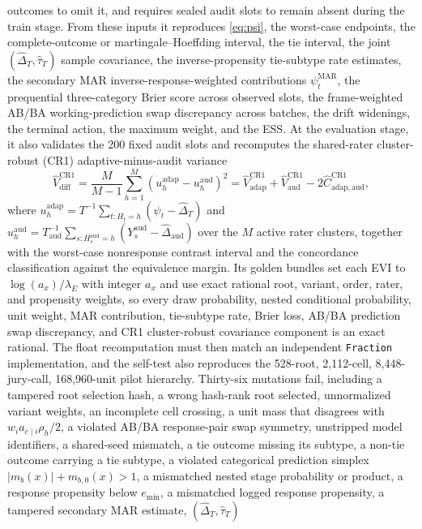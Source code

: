 \documentclass{article}
\begin{document}
outcomes to omit it, and requires sealed audit slots to remain absent during the
train stage. From these inputs it reproduces \cref{eq:psi}, the worst-case
endpoints, the complete-outcome or martingale--Hoeffding interval, the tie
interval, the joint $(\widehat\Delta_T,\widehat\tau_T)$ sample covariance, the
inverse-propensity tie-subtype rate estimates, the secondary MAR
inverse-response-weighted contributions $\psi_t^{\mathrm{MAR}}$, the prequential
three-category Brier score across observed slots, the frame-weighted AB/BA
working-prediction swap discrepancy across batches, the drift widenings, the terminal action, the maximum weight, and
the ESS. At the evaluation stage, it also validates the 200 fixed audit slots
and recomputes the shared-rater cluster-robust (CR1) adaptive-minus-audit
variance
\[
\widehat V_{\mathrm{diff}}^{\mathrm{CR1}}
=\frac{M}{M-1}\sum_{h=1}^{M}(u_h^{\mathrm{adap}}-u_h^{\mathrm{aud}})^2
=\widehat V_{\mathrm{adap}}^{\mathrm{CR1}}
+\widehat V_{\mathrm{aud}}^{\mathrm{CR1}}
-2\widehat C_{\mathrm{adap,aud}}^{\mathrm{CR1}},
\]
where $u_h^{\mathrm{adap}}=T^{-1}\sum_{t:H_t=h}(\psi_t-\widehat\Delta_T)$ and
$u_h^{\mathrm{aud}}=T_{\mathrm{aud}}^{-1}\sum_{s:H_s^{\mathrm{aud}}=h}
(Y_s^{\mathrm{aud}}-\widehat\Delta_{\mathrm{aud}})$ over the $M$ active rater
clusters, together with the worst-case nonresponse contrast interval and the
concordance classification against the equivalence margin. Its golden bundles
set each EVI to $\log(a_x)/\lambda_E$ with integer
$a_x$ and use exact rational root, variant, order, rater, and propensity weights, so every
draw probability, nested conditional probability, unit weight, MAR contribution, tie-subtype rate, Brier loss, AB/BA prediction swap discrepancy, and CR1 cluster-robust covariance component is
an exact rational. The float recomputation
must then match an independent \texttt{Fraction} implementation, and the
self-test also reproduces the 528-root, 2,112-cell, 8,448-jury-call,
168,960-unit pilot hierarchy. Thirty-six
mutations fail, including a tampered root selection hash, a wrong hash-rank
root selected, unnormalized variant weights, an incomplete cell crossing, a
unit mass that disagrees with $w_ia_{c\mid i}\rho_h/2$, a violated AB/BA
response-pair swap symmetry, unstripped model identifiers, a shared-seed
mismatch, a tie outcome missing its subtype, a non-tie outcome carrying a tie
subtype, a violated categorical prediction simplex $|m_b(x)|+m_{b,0}(x)>1$, a
mismatched nested stage probability or product, a response propensity below $e_{\min}$, a mismatched logged response
propensity, a tampered secondary MAR estimate, $(\widehat\Delta_T,\widehat\tau_T)$
\end{document}
